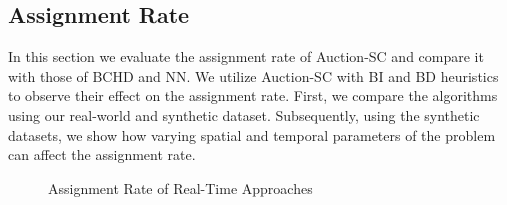 \subsection{Assignment Rate}
In this section we evaluate the assignment rate of Auction-SC and compare it with those of BCHD and NN. We utilize Auction-SC with BI and BD heuristics to observe their effect on the assignment rate. First, we compare the algorithms using our real-world and synthetic dataset. Subsequently, using the synthetic datasets, we show how varying spatial and temporal parameters of the problem can affect the assignment rate.

\begin{figure}[h]
    \centering
    \vspace{-0.15in}
    \caption{Assignment Rate of Real-Time Approaches}
    \label{fig:quality}
\end{figure}

